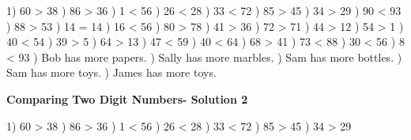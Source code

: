 \documentclass{article}%
\begin{document}
1) 60 > 38%
) 86 > 36%
) 1 < 56%
) 26 < 28%
) 33 < 72%
) 85 > 45%
) 34 > 29%
) 90 < 93%
) 88 > 53%
) 14 = 14%
) 16 < 56%
) 80 > 78%
) 41 > 36%
) 72 > 71%
) 44 > 12%
) 54 > 1%
) 40 < 54%
) 39 > 5%
) 64 > 13%
) 47 < 59%
) 40 < 64%
) 68 > 41%
) 73 < 88%
) 30 < 56%
) 8 < 93%
) Bob has more papers.%
) Sally has more marbles.%
) Sam has more bottles.%
) Sam has more toys.%
) James has more toys.%
\newline%
\newpage%
\large%
\begin{center}%
\textbf{Comparing Two Digit Numbers- Solution 2}%
\newline%
\end{center} \normalsize%
1) 60 > 38%
) 86 > 36%
) 1 < 56%
) 26 < 28%
) 33 < 72%
) 85 > 45%
) 34 > 29%
\newline%
\end{document}
